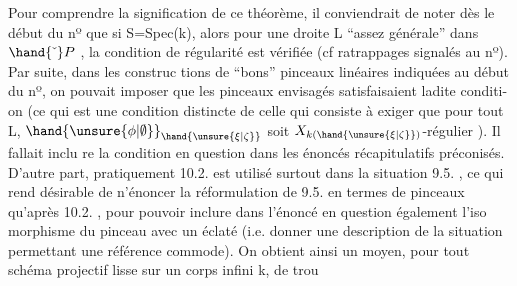  

Pour comprendre la signification de ce théorème, il conviendrait
de noter dès le début du nº que  si S=Spec(k), alors pour une droite
L ``assez générale'' dans $\hand{\check{\ }}P$ ,  la condition de régularité est vérifiée
(cf ratrappages signalés au  nº).  Par suite, dans les construc%
tions de ``bons'' pinceaux linéaires  indiquées au début du nº, on pouvait
imposer que les pinceaux envisagés  satisfaisaient ladite conditi-
on  (ce qui  est une condition distincte de celle qui consiste à
exiger que pour tout \hand{$\unsure{\xi|\zeta}\in$}L,  $\hand{\unsure{\phi|\emptyset}}_{\hand{\unsure{\xi|\zeta}}}$  soit $X_{k(\hand{\unsure{\xi|\zeta}})}$-régulier ). Il fallait inclu
re la condition en question dans les énoncés récapitulatifs préconisés.
  D'autre part, pratiquement  10.2. est
utilisé surtout dans la situation 9.5. ,  ce qui  rend  désirable de
n'énoncer la réformulation de  9.5.  en termes de pinceaux qu'après
10.2. , pour pouvoir  inclure dans l'énoncé en question  également l'iso
morphisme du pinceau avec un éclaté (i.e. donner une description de la
situation  permettant une référence commode).  On obtient ainsi un
moyen, pour tout schéma projectif lisse sur un corps infini k,  de trou
